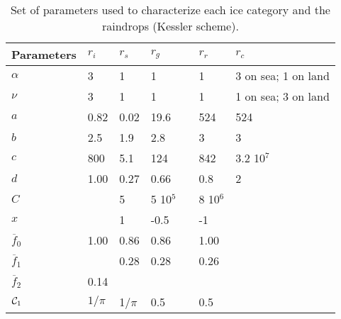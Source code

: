 \begin{table}
\caption{Set of parameters used to characterize each ice category
and the raindrops (Kessler scheme).}
\begin{center}\label{table2}
\begin{tabular}{|l|l|l|l|l|l|l|}
\hline
Parameters & $r_i$ & $r_s$ & $r_g$ && $r_r$ & $r_c$ \\
\hline \hline
$\alpha$ & 3 & 1 & 1 && 1 & 3 on sea; 1 on land \\
$\nu$    & 3 & 1 & 1 && 1 & 1 on sea; 3 on land \\
\hline
$a$ & 0.82 & 0.02 & 19.6 && 524 & 524 \\
$b$ & 2.5  & 1.9  & 2.8 && 3 & 3  \\
\hline
$c$ & 800  & 5.1  & 124 && 842 & 3.2 10$^7$ \\
$d$ & 1.00 & 0.27 & 0.66 && 0.8 & 2 \\
\hline
$C$ & & 5 & 5 10$^5$ && 8 10$^6$ & \\
$x$ & & 1 &    -0.5   &&   -1  &  \\
\hline
$\overline{f}_0$ & 1.00 & 0.86 & 0.86 && 1.00 & \\
$\overline{f}_1$ &      & 0.28 & 0.28 && 0.26 & \\
$\overline{f}_2$ & 0.14 &      &      &&      & \\
\hline
${\cal C}_{1}$ & $1/\pi$ & 1/$\pi$ & 0.5 && 0.5 & \\
\hline
\end{tabular}
\end{center}
\end{table}

